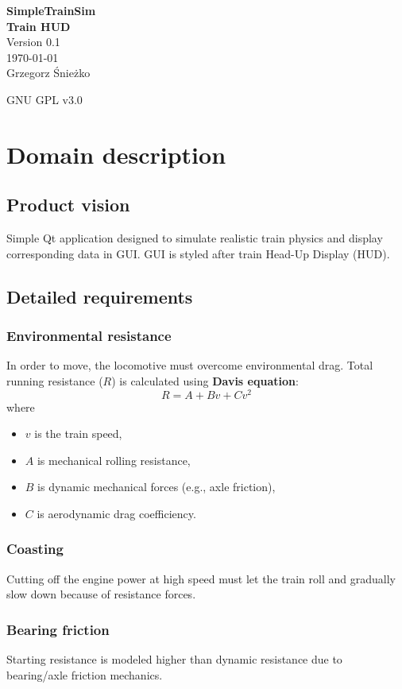 \documentclass[12pt,a4paper]{report}
\newcommand{\makecustomtitle}[5]{%
    \newgeometry{margin=1.5in}
    \thispagestyle{empty}
    
    \begin{center}
        \vspace*{\fill}
        
        {\Huge \textbf{#1}} \\[1em]       %
        {\Large \textbf{#2}} \\[2em]      %
        
        {\large Version #3} \\[1.5em]     %
        
        {\large \today} \\[3em]           %
        
        {\large #4}                       %
        
        \vspace*{\fill}

        {\large #5}                       %
    \end{center}
    
    \clearpage
    \restoregeometry
    
    \tableofcontents
    \clearpage
}
\begin{document}
\makecustomtitle
  {SimpleTrainSim} %
  {Train HUD}        %
  {0.1}              %
  {Grzegorz Śnieżko} %
  {GNU GPL v3.0}         %

\chapter{Domain description}
\section{Product vision}
Simple Qt application designed to simulate realistic train physics and display corresponding data in GUI. GUI is styled after train Head-Up Display (HUD).

\section{Detailed requirements}
    \subsection{Environmental resistance} \label{sec:davis}
    In order to move, the locomotive must overcome environmental drag. 
    Total running resistance ($R$) is calculated using \textbf{Davis equation}:
        \begin{equation}
            R = A + Bv + Cv^2
        \end{equation}
    where 
    \begin{itemize}[noitemsep]
        \item $v$ is the train speed,
        \item $A$ is mechanical rolling resistance,
        \item $B$ is dynamic mechanical forces (e.g., axle friction),
        \item $C$ is aerodynamic drag coefficiency.
    \end{itemize}

    \subsection{Coasting}
    Cutting off the engine power at high speed must let the train roll and gradually slow down because of resistance forces.
    
    \subsection{Bearing friction}
    Starting resistance is modeled higher than dynamic resistance
    due to bearing/axle friction mechanics.
\end{document}
